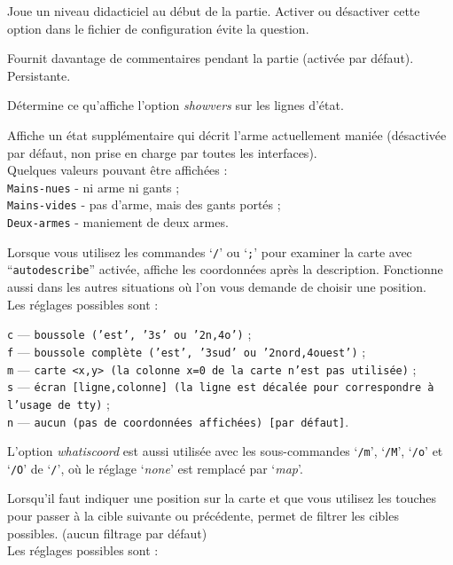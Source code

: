 \documentclass[titlepage]{article}
\begin{document}
\begin{description}[font=\mdseries\itshape]
\item[tutorial]
Joue un niveau didacticiel au début de la partie.
Activer ou désactiver cette option dans le fichier de configuration évite la question.
\item[verbose]
Fournit davantage de commentaires pendant la partie (activée par défaut). Persistante.
\item[versinfo]
Détermine ce qu'affiche l'option \textit{showvers} sur les lignes d'état.
\item[weaponstatus]
Affiche un état supplémentaire qui décrit l'arme actuellement maniée
(désactivée par défaut, non prise en charge par toutes les interfaces).
\\
Quelques valeurs pouvant être affichées :
\\
\texttt{Mains-nues} - ni arme ni gants ;\\
\texttt{Mains-vides} - pas d'arme, mais des gants portés ;\\
\texttt{Deux-armes} - maniement de deux armes.
\item[whatis\textunderscore coord]
Lorsque vous utilisez les commandes `\texttt{/}' ou `\texttt{;}' pour examiner la carte avec
``\texttt{autodescribe}''
activée, affiche les coordonnées après la description.
Fonctionne aussi dans les autres situations où l'on vous demande de choisir une position.\\

Les réglages possibles sont :

\texttt{c} --- \texttt{boussole ('est', '3s' ou '2n,4o')} ;\\
\texttt{f} --- \texttt{boussole complète ('est', '3sud' ou '2nord,4ouest')} ;\\
\texttt{m} --- \texttt{carte <x,y> (la colonne x=0 de la carte n'est pas utilisée)} ;\\
\texttt{s} --- \texttt{écran [ligne,colonne] (la ligne est décalée pour correspondre à l'usage de tty)} ;\\
\texttt{n} --- \texttt{aucun (pas de coordonnées affichées) [par défaut]}.

L'option
\textit{whatis\textunderscore coord}
est aussi utilisée avec
les sous-commandes `\texttt{/m}', `\texttt{/M}', `\texttt{/o}' et `\texttt{/O}'
de `\texttt{/}',
où le réglage `\textit{none}' est remplacé par `\textit{map}'.
\item[whatis\textunderscore filter]
Lorsqu'il faut indiquer une position sur la carte et que vous utilisez les touches pour
passer à la cible suivante ou précédente, permet de filtrer les cibles possibles.
(aucun filtrage par défaut)\\
Les réglages possibles sont :


\end{description}
\end{document}
